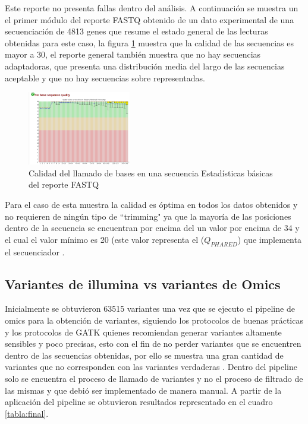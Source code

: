 Este reporte no presenta fallas dentro del análisis. A continuación se muestra un el primer módulo del reporte FASTQ obtenido de un dato experimental de una secuenciación de 4813 genes que resume el estado general de las lecturas obtenidas para este caso, la figura \ref{fig:fastq2} muestra que la calidad de las secuencias es mayor a 30, el reporte general también muestra que no hay secuencias adaptadoras, que presenta una distribución media del largo de las secuencias aceptable y que no hay secuencias sobre representadas.  \\

\begin{figure}[H]
	\centering
	\includegraphics[width=0.4\textwidth]{Kap2/fastq2}
	\caption{Calidad del llamado de bases en una secuencia Estadísticas básicas del reporte FASTQ} \label{fig:fastq2}
\end{figure}

Para el caso de esta muestra la calidad es óptima en todos los datos obtenidos y no requieren de ningún tipo de ``trimming" ya que la mayoría de las posiciones dentro de la secuencia se encuentran por encima del un valor por encima de 34 y el cual el valor mínimo es 20 (este valor representa el ($Q_{PHARED}$) que implementa el secuenciador \cite{Babraham2016}. \\ 

\subsection*{Variantes de illumina vs variantes de Omics}

Inicialmente se obtuvieron 63515 variantes una vez que se ejecuto el pipeline de omics para la obtención de variantes, siguiendo los protocolos de buenas prácticas y los protocolos de GATK quienes recomiendan generar variantes altamente sensibles y poco precisas, esto con el fin de no perder variantes que se encuentren dentro de las secuencias obtenidas, por ello se muestra una gran cantidad de variantes que no corresponden con las variantes verdaderas \cite{Auwera2014}. Dentro del pipeline solo se encuentra el proceso de llamado de variantes y no el proceso de filtrado de las mismas y que debió ser implementado de manera manual. A partir de la aplicación del pipeline se obtuvieron resultados representado en el cuadro \ref{tabla:final}. 

